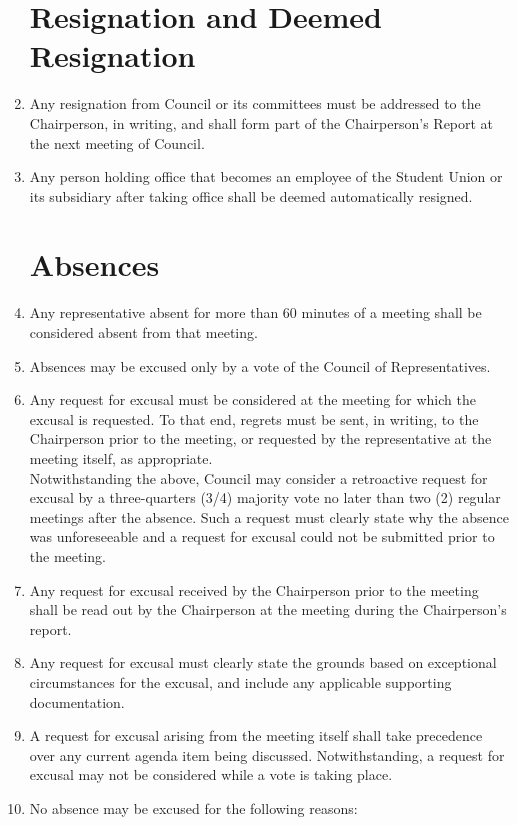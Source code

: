 \documentclass[oneside]{book}
\begin{document}
\begin{enumerate}
\chapter{\label{Resignation_and_Deemed_Resignation}Resignation and Deemed
Resignation}
\item Any resignation from Council or its committees must be addressed to
the Chairperson, in writing, and shall form part of the Chairperson's
Report at the next meeting of Council. 
\item Any person holding office that becomes an employee of the Student
Union or its subsidiary after taking office shall be deemed automatically
resigned.

\chapter{\label{Absences}Absences}
\item Any representative absent for more than 60 minutes of a meeting shall be considered absent from that meeting.
\item Absences may be excused only by a vote of the Council of Representatives.
\item  Any request for excusal must be considered at the meeting for which the excusal is requested. 
To that end, regrets must be sent, in writing, to the Chairperson prior to the meeting, 
or requested by the representative at the meeting itself, as appropriate.
\\Notwithstanding the above, Council may consider a retroactive request for excusal by a
three-quarters (3/4) majority vote no later than two (2) regular meetings after
the absence. Such a request must clearly state why the absence was unforeseeable and a request
for excusal could not be submitted prior to the meeting. 
\item Any request for excusal received by the Chairperson prior to the meeting shall be read out 
by the Chairperson at the meeting during the Chairperson's report. 
\item Any request for excusal must clearly state the grounds based on exceptional circumstances for the excusal, and include any applicable supporting documentation. 
\item A request for excusal arising from the meeting itself shall take precedence over any current agenda item being discussed. Notwithstanding, a request for excusal may not be considered while a vote is taking place. 
\item No absence may be excused for the following reasons:


\end{enumerate}
\end{document}
